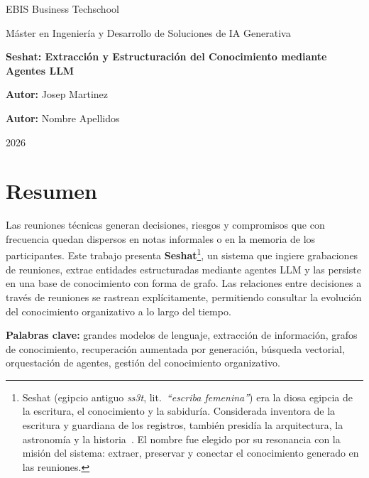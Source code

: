 \documentclass[
  12pt,
  a4paper,
  spanish,
  twoside,
  openany,
  BCOR=10mm,
  DIV=14,
  headinclude,
  footinclude=false
]{scrbook}
\newcommand{\tituloTFM}{Seshat: Extracción y Estructuración del Conocimiento mediante Agentes LLM}
\newcommand{\autorTFM}{Josep Martinez}
\newcommand{\otroautorTFM}{Nombre Apellidos}
\newcommand{\universidadTFM}{EBIS Business Techschool}
\newcommand{\masterTFM}{Máster en Ingeniería y Desarrollo de Soluciones de IA Generativa}
\newcommand{\anioTFM}{2026}
\begin{document}
\hypersetup{pageanchor=false}
\frontmatter

\begin{titlepage}
  \centering
  \vspace*{2cm}
  {\LARGE \universidadTFM \par}
  \vspace{0.5cm}
  {\large \masterTFM \par}
  \vspace{3cm}
  {\huge \bfseries \tituloTFM \par}
  \vspace{2cm}
  {\large \textbf{Autor:} \autorTFM \par}
  \vspace{0.5cm}
  {\large \textbf{Autor:} \otroautorTFM \par}
  \vfill
  {\large \anioTFM \par}
\end{titlepage}

\chapter*{Resumen}

Las reuniones técnicas generan decisiones, riesgos y compromisos que con frecuencia quedan dispersos en notas informales o en la memoria de los participantes. Este trabajo presenta \textbf{Seshat}\footnote{%
  Seshat (egipcio antiguo \emph{ss3t}, lit.\ \emph{``escriba femenina''}) era la diosa egipcia de la escritura, el conocimiento y la sabiduría. Considerada inventora de la escritura y guardiana de los registros, también presidía la arquitectura, la astronomía y la historia~\cite{wilkinson2003gods}. El nombre fue elegido por su resonancia con la misión del sistema: extraer, preservar y conectar el conocimiento generado en las reuniones.%
}, un sistema que ingiere grabaciones de reuniones, extrae entidades estructuradas mediante agentes LLM y las persiste en una base de conocimiento con forma de grafo. Las relaciones entre decisiones a través de reuniones se rastrean explícitamente, permitiendo consultar la evolución del conocimiento organizativo a lo largo del tiempo.

\bigskip
\noindent\textbf{Palabras clave:} grandes modelos de lenguaje, extracción de información, grafos de conocimiento, recuperación aumentada por generación, búsqueda vectorial, orquestación de agentes, gestión del conocimiento organizativo.
\end{document}
